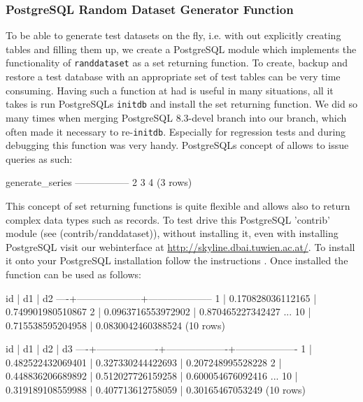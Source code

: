 \subsubsection{PostgreSQL Random Dataset Generator Function}

To be able to generate test datasets on the fly, i.e. with out
explicitly creating tables and filling them up, we create a PostgreSQL
module which implements the functionality of \texttt{randdataset} as a
set returning function. To create, backup and restore a test database
with an appropriate set of test tables can be very time
consuming. Having such a function at had is useful in many situations,
all it takes is run PostgreSQLs \texttt{initdb} and install the set
returning function. We did so many times when merging PostgreSQL
8.3-devel branch into our branch, which often made it necessary to
re-\texttt{initdb}. Especially for regression tests and during
debugging this function was very handy. PostgreSQLs concept of
 allows to
issue queries as such:

\begin{sqlscript}
 generate_series
-----------------
               2
               3
               4
(3 rows)
\end{sqlscript}

This concept of set returning functions is quite flexible and allows
also to return complex data types such as records. To test drive this
PostgreSQL 'contrib' module (see
\srcref(contrib/randdataset)), without installing it, even with
installing PostgreSQL visit our webinterface at
\url{http://skyline.dbai.tuwien.ac.at/}. To install it onto your
PostgreSQL installation follow the instructions
. Once installed the
function can be used as follows:

\begin{sqlscript}
 id |         d1         |         d2
----+--------------------+--------------------
  1 |  0.170828036112165 |  0.749901980510867
  2 | 0.0963716553972902 |  0.870465227342427
...
 10 |  0.715538595204958 | 0.0830042460388524
(10 rows)

 id |        d1         |        d2         |        d3
----+-------------------+-------------------+-------------------
  1 | 0.482522432069401 | 0.327330244422693 | 0.207248995528228
  2 | 0.448836206689892 | 0.512027726159258 | 0.600054676092416
...
 10 | 0.319189108559988 | 0.407713612758059 |  0.30165467053249
(10 rows)

\end{sqlscript}

